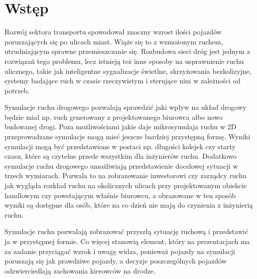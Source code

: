 \documentclass{sprawozdanie-agh}
\begin{document}

	\stronatytulowa{}


	\tableofcontents




	\newpage
	\setlength{\parindent}{0pt} %

	\section{Wstęp}

	Rozwój sektora transportu spowodował znaczny wzrost ilości pojazdów poruszających się po ulicach miast. Wiąże się to z wzmożonym ruchem, utrudniającym sprawne przemieszczanie się. Rozbudowa sieci dróg jest jednym z rozwiązań tego problemu, lecz istnieją też inne sposoby na usprawnienie ruchu ulicznego, takie jak inteligentne sygnalizacje świetlne, skrzyżowania bezkolizyjne, systemy badające ruch w czasie rzeczywistym i sterujące nim w zależności od potrzeb.

	Symulacje ruchu drogowego pozwalają sprawdzić jaki wpływ na układ drogowy będzie miał np. ruch generowany z projektowanego biurowca albo nowo budowanej drogi. Poza możliwościami jakie daje mikrosymulaja ruchu w 2D przeprowadzane symulacje mogą mieć  jeszcze bardziej przystępną formę. Wyniki symulacji mogą być przedstawione w postaci np. długości kolejek czy starty czasu, które są czytelne przede wszystkim dla inżynierów ruchu. Dodatkowo symulacje ruchu drogowego umożliwiają przedstawienie docelowej sytuacji w trzech wymiarach. Pozwala to na zobrazowanie inwestorowi czy zarządcy ruchu jak wygląda rozkład ruchu na okolicznych ulicach przy projektowanym obiekcie handlowym czy powstającym właśnie biurowcu, a obrazowane w ten sposób wyniki są dostępne dla osób, które na co dzień nie mają do czynienia z inżynierią ruchu.

	Symulacje ruchu pozwalają zobrazować przyszłą sytuację ruchową i przedstawić ja w przystępnej formie. Co więcej stanowią element, który na prezentacjach ma za zadanie przyciągać wzrok i uwagę widza, ponieważ pojazdy na symulacji poruszają się jak prawdziwe pojazdy, a decyzje poszczególnych pojazdów odzwierciedlają zachowania kierowców na drodze.
\end{document}
